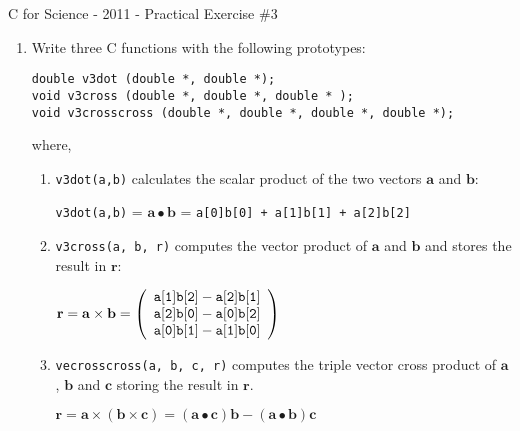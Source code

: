\documentclass[a4paper,12pt]{article}
\begin{document}
\begin{center}
\large C for Science - 2011 - Practical Exercise \#3
\end{center}
\begin{enumerate}
\item Write three C functions with the following prototypes:
\begin{verbatim}
double v3dot (double *, double *);
void v3cross (double *, double *, double * );
void v3crosscross (double *, double *, double *, double *);
\end{verbatim}
where,
\begin{enumerate}
\item \verb|v3dot(a,b)| calculates the scalar product of the two vectors $\mathbf{a}$ and $\mathbf{b}$:
\begin{center}
{\tt v3dot(a,b)} = $\mathbf{a}\bullet\mathbf{b}$ = {\tt a[0]b[0] + a[1]b[1] + a[2]b[2]}
\end{center}
\item \verb|v3cross(a, b, r)| computes the vector product of $\mathbf{a}$ and $\mathbf{b}$ and stores the result in $\mathbf{r}$:
\begin{center}
$\mathbf{r} = \mathbf{a}\times\mathbf{b} =
\left(\begin{array}{c}
{\tt a[1]b[2] - a[2]b[1]}\\
{\tt a[2]b[0] - a[0]b[2]}\\
{\tt a[0]b[1] - a[1]b[0]}
\end{array}\right)$
\end{center}
\item \verb|vecrosscross(a, b, c, r)| computes the triple vector cross product of $\mathbf{a}$, $\mathbf{b}$ and $\mathbf{c}$ storing the result in
$\mathbf{r}$.
\begin{center}
$\mathbf{r} = \mathbf{a}\times(\mathbf{b}\times\mathbf{c}) = 
(\mathbf{a}\bullet\mathbf{c})\mathbf{b} - (\mathbf{a}\bullet\mathbf{b})\mathbf{c}$
\end{center}
\end{enumerate}


\end{enumerate}
\end{document}
